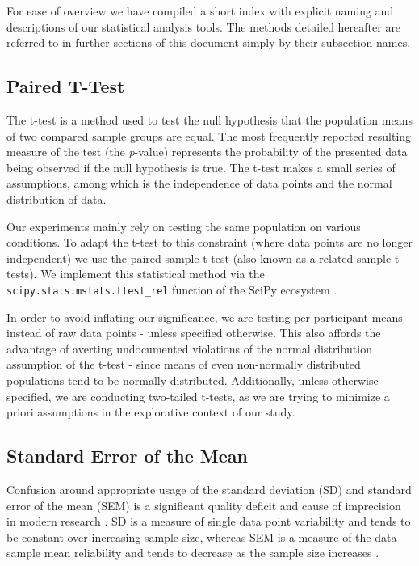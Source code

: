 	For ease of overview we have compiled a short index with explicit naming and descriptions of our statistical analysis tools.
	The methods detailed hereafter are referred to in further sections of this document simply by their subsection names.
	\subsection{Paired T-Test}\label{sec:m_sa_pt}
	    The t-test is a method used to test the null hypothesis that the population means of two compared sample groups are equal.
	    The most frequently reported resulting measure of the test (the \textit{p}-value) represents the probability of the presented data being observed if the null hypothesis is true. 
	    The t-test makes a small series of assumptions, among which is the independence of data points and the normal distribution of data.
	    
	    Our experiments mainly rely on testing the same population on various conditions.
	    To adapt the t-test to this constraint (where data points are no longer independent) we use the paired sample t-test (also known as a related sample t-tests).
	    We implement this statistical method via the \colorbox{vlg}{\texttt{scipy.stats.mstats.ttest\_rel}} function of the SciPy ecosystem \citep{scipy,Oliphant2007}.
	    
	    In order to avoid inflating our significance, we are testing per-participant means instead of raw data points - unless specified otherwise.
	    This also affords the advantage of averting undocumented violations of the normal distribution assumption of the t-test -
	    since means of even non-normally distributed populations tend to be normally distributed.
	    Additionally, unless otherwise specified, we are conducting two-tailed t-tests, as we are trying to minimize a priori assumptions in the explorative context of our study. 
	\subsection{Standard Error of the Mean}\label{sec:m_sa_se}
	    Confusion around appropriate usage of the standard deviation (SD) and standard error of the mean (SEM) is a significant quality deficit and cause of imprecision in modern research \citep{Nagele2003}.
	    SD is a measure of single data point variability and tends to be constant over increasing sample size, 
	    whereas SEM is a measure of the data sample mean reliability and tends to decrease as the sample size increases \citep{Altman2005,Streiner1996}.
	    
